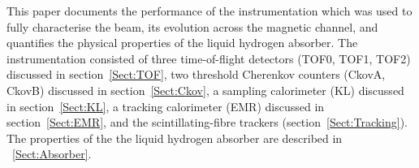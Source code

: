 This paper documents the performance of the instrumentation which was
used to fully characterise the beam, its evolution across the magnetic
channel, and quantifies the physical properties of the liquid hydrogen
absorber.
The instrumentation consisted of three time-of-flight detectors
(TOF0, TOF1, TOF2) discussed in section~\ref{Sect:TOF}, two 
threshold Cherenkov counters (CkovA, CkovB) discussed in
section~\ref{Sect:Ckov}, a sampling calorimeter (KL) discussed in
section~\ref{Sect:KL}, a tracking calorimeter (EMR) discussed in
section~\ref{Sect:EMR}, and the scintillating-fibre trackers
(section~\ref{Sect:Tracking}).
The properties of the the liquid hydrogen
absorber are described in ~\ref{Sect:Absorber}.
